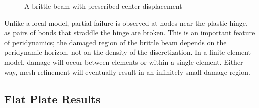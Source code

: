 \begin{figure}[h]
  \centering
  \resizebox{0.7\linewidth}{!}{}
  \caption{A brittle beam with prescribed center displacement}
  \label{fig:brittleBeam}
\end{figure}

Unlike a local model, partial failure is observed at nodes near the plastic hinge, as pairs of bonds that straddle the hinge are broken.
This is an important feature of peridynamics; the damaged region of the brittle beam depends on the peridynamic horizon, not on the density of the discretization.
In a finite element model, damage will occur between elements or within a single element.
Either way, mesh refinement will eventually result in an infinitely small damage region.

\FloatBarrier
\subsection{Flat Plate Results}

